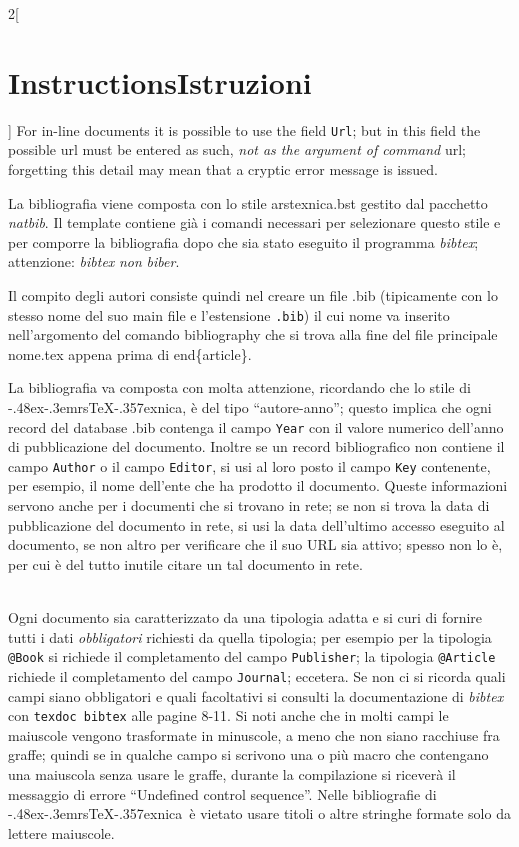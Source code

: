 \documentclass[12pt]{article}
\DeclareRobustCommand*{\Ars}{\textsf{\lower -.48ex\hbox{\rotatebox{-20}{A}}\kern -.3em{rs}}\discretionary{-}{}{\kern -.05em}\TeX\discretionary{-}{}{\kern -.17em}\lower -.357ex\hbox{nica}}
\providecommand\file[1]{\textnormal{\ttfamily#1}}
\providecommand\cs[1]{\textnormal{\ttfamily\char92#1}}
\providecommand\Marg[1]{\textnormal{\ttfamily\{#1\}}}
\providecommand\pack[1]{\textnormal{\sffamily\slshape#1}}
\providecommand\prog[1]{\textnormal{\ttfamily\itshape#1}}
\providecommand\Eambiente[1]{\cs{end}\Marg{#1}}
\providecommand\italian{\selectlanguage{italian}}
\begin{document}
\begin{paracol}{2}[\section{Instructions\hspace{5.6em}Istruzioni}]
For in-line documents it is possible to use the field \texttt{Url}; but in this field the possible url must be entered as such, \emph{not as the argument of command} \cs{url}; forgetting this detail may mean that a cryptic error message is issued.

\italian

La bibliografia viene composta con lo stile \file{arstexnica.bst}  gestito dal pacchetto \pack{natbib}. Il template contiene già i comandi necessari per selezionare questo stile e per comporre la bibliografia dopo che sia stato eseguito il programma \prog{bibtex}; attenzione: \prog{bibtex} \emph{non} \prog{biber}.

Il compito degli autori consiste quindi nel creare un file \file{.bib} (tipicamente con lo stesso nome del suo main file e l'estensione \texttt{.bib}) il cui nome va inserito nell'argomento del comando \cs{bibliography} che si trova alla fine del file principale \file{nome.tex} appena prima di \Eambiente{article}.

La bibliografia va composta con molta attenzione, ricordando che lo stile di \Ars, è del tipo “autore-anno”; questo implica che ogni record del database \file{.bib} contenga il campo \texttt{Year} con il valore numerico dell'anno di pubblicazione del documento. Inoltre se un record bibliografico non contiene il campo \texttt{Author} o il campo \texttt{Editor}, si usi al loro posto il campo \texttt{Key} contenente, per esempio, il nome dell'ente che ha prodotto il documento. Queste informazioni servono anche per i documenti che si trovano in rete; se non si trova la data di pubblicazione del documento in rete, si usi la data dell'ultimo accesso eseguito al documento, se non altro per verificare che il suo URL sia attivo; spesso non lo è, per cui è del tutto inutile citare un tal documento in rete.\\~

Ogni documento sia caratterizzato da una tipologia adatta e si curi di fornire tutti i dati \emph{obbligatori} richiesti da quella tipologia; per esempio per la tipologia \texttt{@Book} si richiede il completamento del campo \texttt{Publisher}; la tipologia \texttt{@Article} richiede il completamento del campo \texttt{Journal}; eccetera. Se non ci si ricorda quali campi siano obbligatori e quali facoltativi si consulti la documentazione di \prog{bibtex} con \texttt{texdoc bibtex} alle pagine 8-11. Si noti anche che in molti campi le maiuscole vengono trasformate in minuscole, a meno che non siano racchiuse fra graffe; quindi se in qualche campo si scrivono una o più macro che contengano una maiuscola senza usare le graffe, durante la compilazione si riceverà il messaggio di errore “Undefined control sequence”.
Nelle bibliografie di \Ars\ è vietato usare titoli o altre stringhe formate solo da lettere maiuscole.\\~


\end{paracol}
\end{document}
